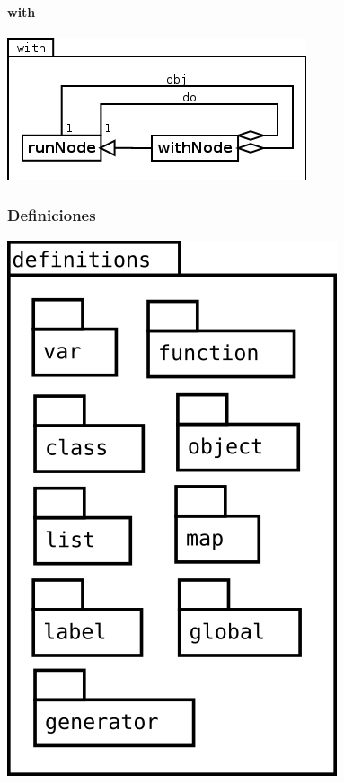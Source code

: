 \paragraph{with}
\begin{center}
\includegraphics[scale=0.4]{with.png} \\
\end{center}
\pagebreak
\subsubsection {Definiciones}
\begin{center}
\includegraphics[scale=0.4]{definitions.png} \\
\end{center}

